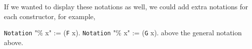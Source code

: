 \documentclass{article}
\makeatletter
\gdef\@makeopenbrace<\catcode`{>
\gdef\@makeclosebrace<\catcode`}>
\newcommand{\processcommands}[1]{{%
  \catcode`\\=0\relax
  \@makeopenbrace=1\relax
  \@makeclosebrace=2\relax
  \def\{{\texttt{\mytextbraceleft}}
  \def\}{\texttt{\mytextbraceright}}
  \scantokens{#1}%
}}
\newcommand{\processcommandsinverbatimline}{\expandafter\processcommands\expandafter{\the\verbatim@line}}
\newenvironment{coqcode}{\begingroup
  \vspace{0.5\baselineskip}
  \let\trivlist\relax
  \let\endtrivlist\relax
  \let\item\relax
  \setlength{\parsep}{0pt}%
  \setlength{\parskip}{0pt}%
  \setlength{\topsep}{0pt}%
  \setlength{\@topsepadd}{0pt}%
  \setlength{\partopsep}{0pt}%
  \setlength{\@topsep}{0pt}%
  \let\old@@par\@@par
  \let\@@par\relax
  \let\old@vskip\vskip
  \let\vskip\relax
  \verbatim
  \let\@@par\old@@par
  \let\vskip\old@vskip
  \let\verbatim@processline=\processcommandsinverbatimline
}{\endverbatim\endgroup\vspace{0.5\baselineskip}}
\newcommand{\coqdockw}[1]{\texttt {\textcolor{kwred}{#1}}}
\newcommand{\coqdocvar}[1]{\textcolor{varpurple}{#1}}
\newcommand{\coqdocax}[1]{\texttt {\textcolor{indblue}{#1}}}
\newcommand{\coqdocnotation}[1]{\coqdockw{#1}}
\newcommand{\coqdocaxiom}[1]{\coqdocax{#1}}
\makeatother
\begin{document}
If we wanted to display these notations as well, we could add extra notations for each constructor, for example,
\begin{coqcode}
\coqdockw{Notation} "\% x" := (\coqdocaxiom{F} \coqdocvar{x}).
\coqdockw{Notation} "\% x" := (\coqdocaxiom{G} \coqdocvar{x}).
\end{coqcode}
\noindent above the general notation above.


\begin{comment}
\newcommand{\Ts}[1]{T\ensuremath{_#1}}
\newcommand{\ts}[1]{t\ensuremath{_#1}}
\begin{coqcode}
\coqdockw{Parameters} \coqdocaxiom{\Ts1} \coqdocaxiom{\Ts2} : \coqdockw{Type}.
\coqdockw{Parameter} \coqdocvar{Compose11} : \coqdocaxiom{\Ts1} \coqdocnotation{\ensuremath{\rightarrow}} \coqdocaxiom{\Ts1} \coqdocnotation{\ensuremath{\rightarrow}} \coqdocaxiom{\Ts1}.
\coqdockw{Parameter} \coqdocvar{Compose12} : \coqdocaxiom{\Ts1} \coqdocnotation{\ensuremath{\rightarrow}} \coqdocaxiom{\Ts2} \coqdocnotation{\ensuremath{\rightarrow}} \coqdocaxiom{\Ts1}.
\coqdockw{Parameter} \coqdocvar{Compose21} : \coqdocaxiom{\Ts2} \coqdocnotation{\ensuremath{\rightarrow}} \coqdocaxiom{\Ts1} \coqdocnotation{\ensuremath{\rightarrow}} \coqdocaxiom{\Ts1}.
\coqdockw{Parameter} \coqdocvar{Compose22} : \coqdocaxiom{\Ts2} \coqdocnotation{\ensuremath{\rightarrow}} \coqdocaxiom{\Ts2} \coqdocnotation{\ensuremath{\rightarrow}} \coqdocaxiom{\Ts2}.
\coqdockw{Parameters} (\coqdocaxiom{\ts1} : \coqdocaxiom{\Ts1}) (\coqdocaxiom{\ts2} : \coqdocaxiom{\Ts2}).
\vspace{0em}
\coqdockw{Class} \coqdocvar{ComposeTo} \{\coqdocvar{A} \coqdocvar{B} \coqdocvar{C}\} (\coqdocvar{a} : \coqdocvar{A}) (\coqdocvar{b} : \coqdocvar{B}) (\coqdocvar{c} : \coqdocvar{C}) := \{\}.

\coqdockw{Definition} \coqdocvar{composition} \coqdocvar{A} \coqdocvar{B} \coqdocvar{C} \coqdocvar{a} \coqdocvar{b} \coqdocvar{c} `\{@\coqdocvar{ComposeTo} \coqdocvar{A} \coqdocvar{B} \coqdocvar{C} \coqdocvar{a} \coqdocvar{b} \coqdocvar{c}\} := \coqdocvar{c}.

\coqdockw{Instance} \coqdocvar{ComposeTo11} \coqdocvar{x} \coqdocvar{y} : \coqdocvar{ComposeTo} \coqdocvar{x} \coqdocvar{y} (\coqdocvar{Compose11} \coqdocvar{x} \coqdocvar{y}) \ensuremath{|} 10.

\coqdockw{Instance} \coqdocvar{ComposeTo12} \coqdocvar{x} \coqdocvar{y} : \coqdocvar{ComposeTo} \coqdocvar{x} \coqdocvar{y} (\coqdocvar{Compose12} \coqdocvar{x} \coqdocvar{y}) \ensuremath{|} 100.


\end{comment}
\end{document}
